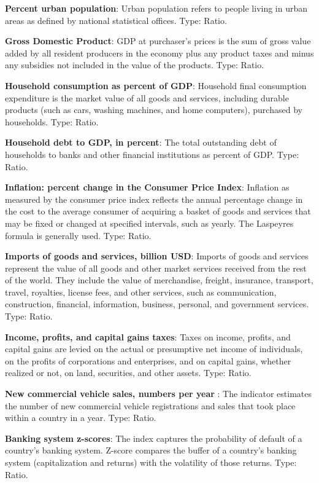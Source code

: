 \documentclass[11pt]{article}
\begin{document}
\begin{appendices}
\textbf{Percent urban population}: Urban population refers to people living in urban areas as defined by national statistical offices. Type: Ratio.

\textbf{Gross Domestic Product}: GDP at purchaser's prices is the sum of gross value added by all resident producers in the economy plus any product taxes and minus any subsidies not included in the value of the products. Type: Ratio.

\textbf{Household consumption as percent of GDP}: Household final consumption expenditure is the market value of all goods and services, including durable products (such as cars, washing machines, and home computers), purchased by households. Type: Ratio.

\textbf{Household debt to GDP, in percent}: The total outstanding debt of households to banks and other financial institutions as percent of GDP. Type: Ratio.

\textbf{Inflation: percent change in the Consumer Price Index}: Inflation as measured by the consumer price index reflects the annual percentage change in the cost to the average consumer of acquiring a basket of goods and services that may be fixed or changed at specified intervals, such as yearly. The Laspeyres formula is generally used. Type: Ratio.

\textbf{Imports of goods and services, billion USD}: Imports of goods and services represent the value of all goods and other market services received from the rest of the world. They include the value of merchandise, freight, insurance, transport, travel, royalties, license fees, and other services, such as communication, construction, financial, information, business, personal, and government services. Type: Ratio.

\textbf{Income, profits, and capital gains taxes}: Taxes on income, profits, and capital gains are levied on the actual or presumptive net income of individuals, on the profits of corporations and enterprises, and on capital gains, whether realized or not, on land, securities, and other assets. Type: Ratio.

\textbf{New commercial vehicle sales, numbers per year }: The indicator estimates the number of new commercial vehicle registrations and sales that took place within a country in a year. Type: Ratio.

\textbf{Banking system z-scores}: The index captures the probability of default of a country's banking system. Z-score compares the buffer of a country's banking system (capitalization and returns) with the volatility of those returns. Type: Ratio.


\end{appendices}
\end{document}
